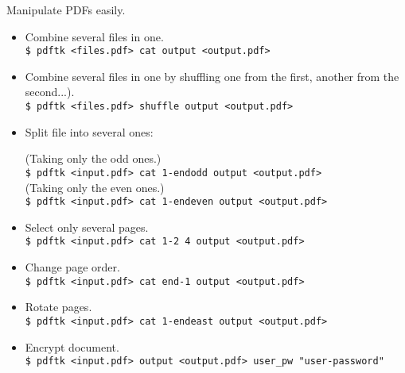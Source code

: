 Manipulate PDFs easily.
\begin{itemize}[label={-}, leftmargin=*]
    \item Combine several files in one.\\
    {\tt \$ pdftk <files.pdf> cat output <output.pdf>}
    
    \item Combine several files in one by shuffling one from the first, another from the second...).\\
    {\tt \$ pdftk <files.pdf> shuffle output <output.pdf>}
    
    \item Split file into several ones:
    
    (Taking only the odd ones.)\\
    {\tt \$ pdftk <input.pdf> cat 1-endodd output <output.pdf>}\\
    (Taking only the even ones.)\\
    {\tt \$ pdftk <input.pdf> cat 1-endeven output <output.pdf>}
    
    \item Select only several pages.\\
    {\tt \$ pdftk <input.pdf> cat 1-2 4 output <output.pdf>}
    
    \item Change page order.\\
    {\tt \$ pdftk <input.pdf> cat end-1 output <output.pdf>}
    
    \item Rotate pages.\\
    {\tt \$ pdftk <input.pdf> cat 1-endeast output <output.pdf>}
    
    \item Encrypt document.\\
    {\tt \$ pdftk <input.pdf> output <output.pdf> user\_pw "user-password"}
    

\end{itemize}    
